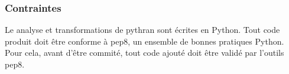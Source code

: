 \documentclass[a4paper]{article}
\begin{document}
\subsubsection{Contraintes}

Le analyse et transformations de pythran sont écrites en Python. Tout
code produit doit être conforme à pep8, un ensemble de bonnes
pratiques Python. Pour cela, avant d'être commité, tout code ajouté
doit être validé par l'outils pep8.


\clearpage

\appendix


\listoffigures            




\todos
\end{document}
